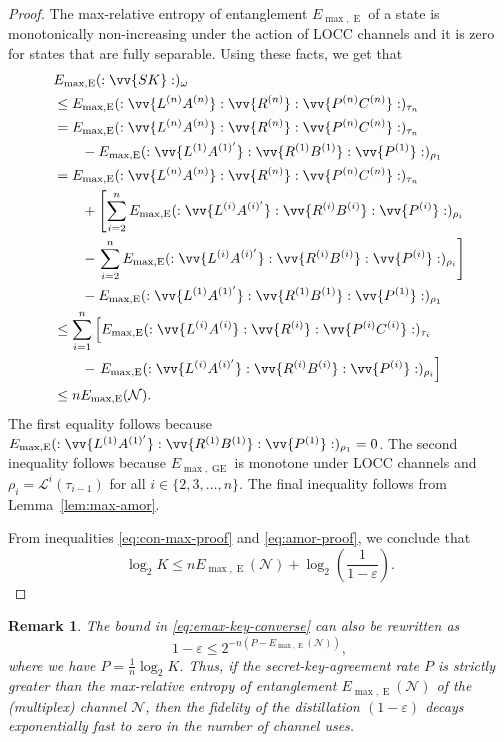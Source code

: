 \documentclass[aps,pra,twocolumn,superscriptaddress,longbibliography]{revtex4-1}
\def\GE{\operatorname{GE}}
\def\E{\operatorname{E}}
\newcommand{\mc}[1]{\mathcal{#1}}
\newtheorem{remark}{Remark}
\begin{document}
\begin{proof}
The max-relative entropy of entanglement $E_{\max,\E}$ of a state is monotonically non-increasing under the action of LOCC channels and it is zero for states that are fully separable. Using these facts, we get that
\begin{align}
& E_{\max,\E}(:\vv{SK}:)_{\omega}\nonumber \\
&\leq E_{\max,\E}(:\vv{L^{(n)}A^{(n)}}:\vv{R^{(n)}}:\vv{P^{(n)}C^{(n)}}:)_{\tau_n} \label{eq:52}\\
&=  E_{\max,\E}(:\vv{L^{(n)}A^{(n)}}:\vv{R^{(n)}}:\vv{P^{(n)}C^{(n)}}:)_{\tau_n} \nonumber\\
&\qquad - E_{\max,\E}(:\vv{L^{(1)}A^{(1)'}}:\vv{R^{(1)}B^{(1)}}:\vv{P^{(1)}}:)_{\rho_1}\\ 
&=E_{\max,\E}(:\vv{L^{(n)}A^{(n)}}:\vv{R^{(n)}}:\vv{P^{(n)}C^{(n)}}:)_{\tau_n} \nonumber\\ 
&\qquad +\left[\sum_{i=2}^n E_{\max,\E}(:\vv{L^{(i)}A^{(i)'}}:\vv{R^{(i)}B^{(i)}}:\vv{P^{(i)}}:)_{\rho_{i}} \right.\nonumber \\
&\qquad  -\left. \sum_{i=2}^n E_{\max,\E}(:\vv{L^{(i)}A^{(i)'}}:\vv{R^{(i)}B^{(i)}}:\vv{P^{(i)}}:)_{\rho_{i}} \right]\nonumber \\
&\qquad - E_{\max,\E}(:\vv{L^{(1)}A^{(1)'}}:\vv{R^{(1)}B^{(1)}}:\vv{P^{(1)}}:)_{\rho_{1}}\\
& \leq \sum_{i=1}^n \left[ E_{\max,\E}(:\vv{L^{(i)}A^{(i)}}:\vv{R^{(i)}}:\vv{P^{(i)}C^{(i)}}:)_{\tau_{i}} \right. \nonumber\\
&\qquad -\left.  E_{\max,\E}(:\vv{L^{(i)}A^{(i)'}}:\vv{R^{(i)}B^{(i)}}:\vv{P^{(i)}}:)_{\rho_{i}} \right]\\
&\leq n E_{\max,\E}(\mc{N}).\label{eq:amor-proof}
\end{align}
The first equality follows because $E_{\max,\E}(:\vv{L^{(1)}A^{(1)'}}:\vv{R^{(1)}B^{(1)}}:\vv{P^{(1)}}:)_{\rho_{1}}=0$. The second inequality follows because $E_{\max,\GE}$ is monotone under LOCC channels and $\rho_{i}=\mc{L}^{i}(\tau_{i-1})$ for all $i\in\{2,3,\ldots,n\}$. The final inequality follows from Lemma~\ref{lem:max-amor}.

From inequalities \eqref{eq:con-max-proof} and \eqref{eq:amor-proof}, we conclude that
\begin{equation}
\log_2K\leq nE_{\max,\E}(\mc{N})+\log_2\left(\frac{1}{1-\varepsilon}\right).
\end{equation}
\end{proof}
\fi

\begin{remark}
The bound in \eqref{eq:emax-key-converse} can also be rewritten as 
\begin{equation}
1-\varepsilon \leq 2^{-n (P-E_{\max,\E}(\mc{N}))},
\end{equation}
where we have $P=\frac{1}{n}\log_2 K$. Thus, if the secret-key-agreement rate $P$ is strictly greater than the max-relative entropy of entanglement $E_{\max,\E}(\mc{N})$ of the (multiplex) channel $\mc{N}$, then the fidelity of the distillation $(1-\varepsilon)$ decays exponentially fast to zero in the number of channel uses. 
\end{remark} 
\end{document}
